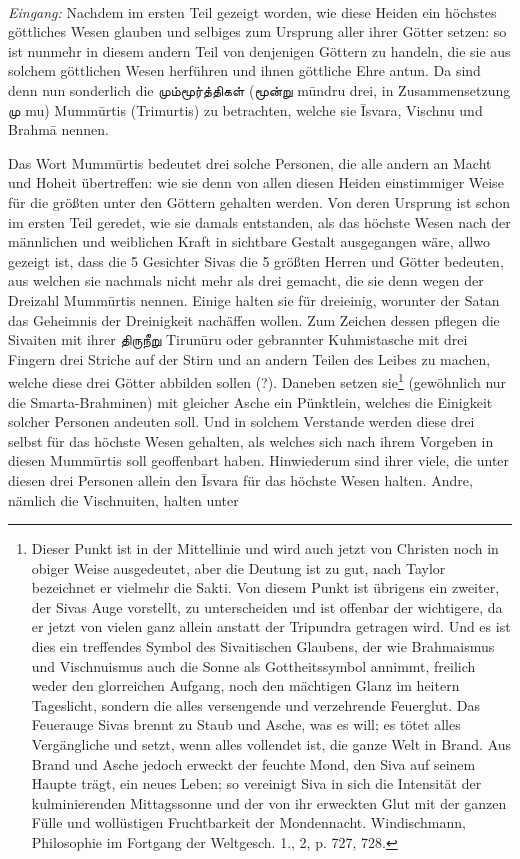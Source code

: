 \documentclass{article}
\newcommand{\TamilText}[1]{\texttamil{#1}}
\newcommand{\tam}[1]{\TamilText{#1}}
\begin{document}
\paragraph{}
\emph{Eingang:} Nachdem im ersten Teil gezeigt worden, wie diese Heiden ein höchstes göttliches Wesen glauben und selbiges zum Ursprung aller ihrer Götter setzen: so ist nunmehr in diesem andern Teil von denjenigen Göttern zu handeln, die sie aus solchem göttlichen Wesen herführen und ihnen göttliche Ehre antun. Da sind denn nun sonderlich die \tam{மும்மூர்த்திகள்} (\tam{மூன்று} m\={u}ndru drei, in Zusammensetzung \tam{மு} mu) Mumm\={u}rtis (Trimurtis) zu betrachten, welche sie \={I}svara, Vischnu und Brahm\={a} nennen.

Das Wort Mumm\={u}rtis bedeutet drei solche Personen, die alle andern an Macht und Hoheit übertreffen: wie sie denn von allen diesen Heiden einstimmiger Weise für die größten unter den Göttern gehalten werden. Von deren Ursprung ist schon im ersten Teil geredet, wie sie damals entstanden, als das höchste Wesen nach der männlichen und weiblichen Kraft in sichtbare Gestalt ausgegangen wäre, allwo gezeigt ist, dass die 5 Gesichter Sivas die 5 größten Herren und Götter bedeuten, aus welchen sie nachmals nicht mehr als drei gemacht, die sie denn wegen der Dreizahl Mumm\={u}rtis nennen. Einige halten sie für dreieinig, worunter der Satan das Geheimnis der Dreinigkeit nachäffen wollen. Zum Zeichen dessen pflegen die Sivaiten mit ihrer \tam{திருநீறு} Tirun\={u}ru oder gebrannter Kuhmistasche mit drei Fingern drei Striche auf der Stirn und an andern Teilen des Leibes zu machen, welche diese drei Götter abbilden sollen (?). Daneben setzen sie\footnote{Dieser Punkt ist in der Mittellinie und wird auch jetzt von Christen noch in obiger Weise ausgedeutet, aber die Deutung ist zu gut, nach Taylor bezeichnet er vielmehr die Sakti. Von diesem Punkt ist übrigens ein zweiter, der Sivas Auge vorstellt, zu unterscheiden und ist offenbar der wichtigere, da er jetzt von vielen ganz allein anstatt der Tripundra getragen wird. Und es ist dies ein treffendes Symbol des Sivaitischen Glaubens, der wie Brahmaismus und Vischnuismus auch die Sonne als Gottheitssymbol annimmt, freilich weder den glorreichen Aufgang, noch den mächtigen Glanz im heitern Tageslicht, sondern die alles versengende und verzehrende Feuerglut. Das Feuerauge Sivas brennt zu Staub und Asche, was es will; es tötet alles Vergängliche und setzt, wenn alles vollendet ist, die ganze Welt in Brand. Aus Brand und Asche jedoch erweckt der feuchte Mond, den Siva auf seinem Haupte trägt, ein neues Leben; so vereinigt Siva in sich die Intensität der kulminierenden Mittagssonne und der von ihr erweckten Glut mit der ganzen Fülle und wollüstigen Fruchtbarkeit der Mondennacht. Windischmann, Philosophie im Fortgang der Weltgesch. 1., 2, p. 727, 728.} (gewöhnlich nur die Smarta-Brahminen) mit gleicher Asche ein Pünktlein, welches die Einigkeit solcher Personen andeuten soll. Und in solchem Verstande werden diese drei selbst für das höchste Wesen gehalten, als welches sich nach ihrem Vorgeben in diesen Mumm\={u}rtis soll geoffenbart haben. Hinwiederum sind ihrer viele, die unter diesen drei Personen allein den \={I}svara für das höchste Wesen halten. Andre, nämlich die Vischnuiten, halten unter 
\end{document}
